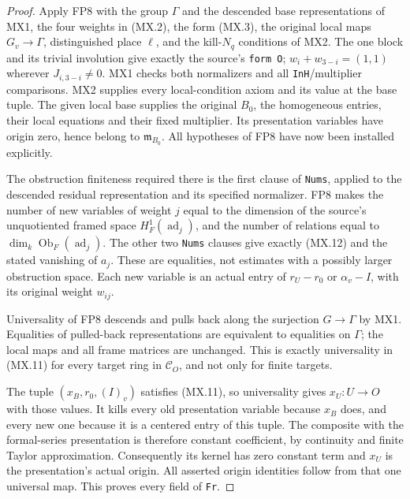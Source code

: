 \begin{proof}
Apply FP8 with the group $\Gamma$ and the descended base
representations of MX1, the four weights in (MX.2), the form
(MX.3), the original local maps $G_v\to\Gamma$, distinguished
place $\ell$, and the kill-$N_q$ conditions of MX2.
The one block and its trivial involution give exactly the
source's \texttt{form O}; $w_i+w_{3-i}=(1,1)$ wherever
$J_{i,3-i}\ne0$.  MX1 checks both normalizers and all
\texttt{InH}/multiplier comparisons.  MX2 supplies every
local-condition axiom and its value at the base tuple.
The given local base supplies the original $B_0$, the
homogeneous entries, their local equations and their
fixed multiplier.  Its presentation variables have origin
zero, hence belong to $\mathfrak m_{B_0}$.
All hypotheses of FP8 have now been installed explicitly.

The obstruction finiteness required there is the first
clause of \texttt{Nums}, applied to the descended residual
representation and its specified normalizer.  FP8 makes the
number of new variables of weight $j$ equal to the
dimension of the source's unquotiented framed space
$H^1_F(\operatorname{ad}_j)$, and the number of relations
equal to $\dim_k\operatorname{Ob}_F(\operatorname{ad}_j)$.
The other two \texttt{Nums} clauses give exactly (MX.12)
and the stated vanishing of $a_j$.  These are equalities,
not estimates with a possibly larger obstruction space.
Each new variable is an actual entry of $r_U-r_0$ or
$\alpha_v-I$, with its original weight $w_{ij}$.

Universality of FP8 descends and pulls back along the
surjection $G\to\Gamma$ by MX1.  Equalities of pulled-back
representations are equivalent to equalities on $\Gamma$;
the local maps and all frame matrices are unchanged.
This is exactly universality in (MX.11) for every target
ring in $\mathcal C_O$, and not only for finite targets.

The tuple $(x_B,r_0,(I)_v)$ satisfies (MX.11), so universality
gives $x_U:U\to O$ with those values.  It kills every old
presentation variable because $x_B$ does, and every new one
because it is a centered entry of this tuple.  The composite
with the formal-series presentation is therefore constant
coefficient, by continuity and finite Taylor approximation.
Consequently its kernel has zero constant term and
$x_U$ is the presentation's actual origin.
All asserted origin identities follow from that one
universal map.  This proves every field of \texttt{Fr}.
\end{proof}

